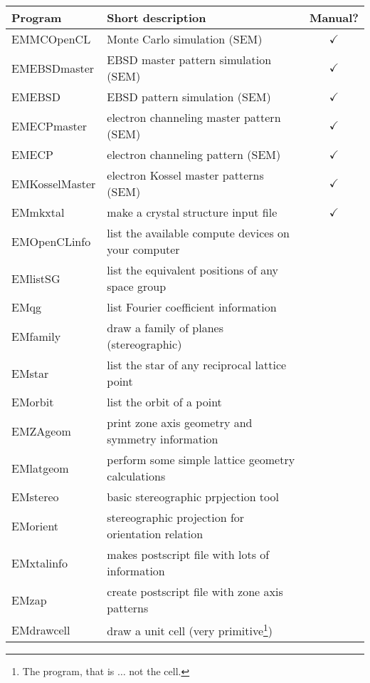 \documentclass[DIV=calc, paper=letter, fontsize=11pt]{scrartcl}	 %
\begin{document}
\begin{table*}[h]
\centering\leavevmode
\begin{tabular}{|l|l|c|}
\hline
Program & Short description & Manual? \\
\hline\hline
  \textsf{EMMCOpenCL} & Monte Carlo simulation (SEM) & $\checkmark$\\
  \textsf{EMEBSDmaster} & EBSD master pattern simulation (SEM) & $\checkmark$\\
  \textsf{EMEBSD} & EBSD pattern simulation (SEM) & $\checkmark$\\
  \textsf{EMECPmaster} & electron channeling master pattern (SEM) & $\checkmark$\\
  \textsf{EMECP} & electron channeling pattern (SEM) & $\checkmark$\\
  \textsf{EMKosselMaster} & electron Kossel master patterns (SEM) & $\checkmark$ \\
\hline
  \textsf{EMmkxtal} & make a crystal structure input file& $\checkmark$\\
  \textsf{EMOpenCLinfo} & list the available compute devices on your computer & \\
  \textsf{EMlistSG} & list the equivalent positions of any space group & \\
  \textsf{EMqg} & list Fourier coefficient information & \\
  \textsf{EMfamily} & draw a family of planes (stereographic) & \\
  \textsf{EMstar} & list the star of any reciprocal lattice point & \\
  \textsf{EMorbit} & list the orbit of a point & \\
  \textsf{EMZAgeom} & print zone axis geometry and symmetry information & \\
  \textsf{EMlatgeom} & perform some simple lattice geometry calculations & \\
  \textsf{EMstereo} & basic stereographic prpjection tool & \\
  \textsf{EMorient} & stereographic projection for orientation relation & \\
  \textsf{EMxtalinfo} & makes postscript file with lots of information & \\
  \textsf{EMzap} & create postscript file with zone axis patterns & \\
  \textsf{EMdrawcell} & draw a unit cell (very primitive\footnote{The program, that is $\ldots$ not the cell.}) & \\
\hline
\end{tabular}
\end{table*}
\end{document}
